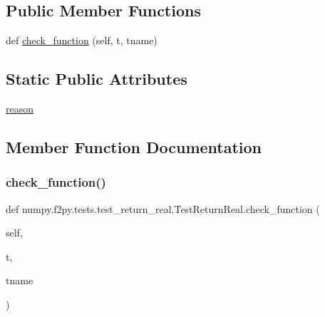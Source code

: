 \subsection*{Public Member Functions}
\begin{DoxyCompactItemize}
\item 
def \hyperlink{classnumpy_1_1f2py_1_1tests_1_1test__return__real_1_1TestReturnReal_af9bebccc41862069908403c2e30ad943}{check\+\_\+function} (self, t, tname)
\end{DoxyCompactItemize}
\subsection*{Static Public Attributes}
\begin{DoxyCompactItemize}
\item 
\hyperlink{classnumpy_1_1f2py_1_1tests_1_1test__return__real_1_1TestReturnReal_a87b3965a3c8c643100e2930e93937757}{reason}
\end{DoxyCompactItemize}


\subsection{Member Function Documentation}
\mbox{\label{classnumpy_1_1f2py_1_1tests_1_1test__return__real_1_1TestReturnReal_af9bebccc41862069908403c2e30ad943}} 
\subsubsection{\texorpdfstring{check\+\_\+function()}{check\_function()}}
{\footnotesize\ttfamily def numpy.\+f2py.\+tests.\+test\+\_\+return\+\_\+real.\+Test\+Return\+Real.\+check\+\_\+function (\begin{DoxyParamCaption}\item[{}]{self,  }\item[{}]{t,  }\item[{}]{tname }\end{DoxyParamCaption})}




